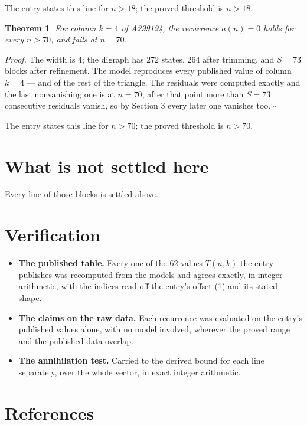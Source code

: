\documentclass[11pt]{article}
\newtheorem{theorem}{Theorem}
\theoremstyle{definition}
\begin{document}
The entry states this line for $n > 18$; the proved threshold is $n > 18$.

\begin{theorem} For column $k = 4$ of A299194, the recurrence $a(n) = 0$ holds for every $n > 70$, and fails at $n = 70$.\end{theorem}

{\itshape Proof.} The width is $4$; the digraph has $272$ states, $264$ after trimming, and $S = 73$ blocks after refinement. The model reproduces every published value of column $k = 4$ --- and of the rest of the triangle. The residuals were computed exactly and the last nonvanishing one is at $n = 70$; after that point more than $S = 73$ consecutive residuals vanish, so by Section 3 every later one vanishes too. $\square$

The entry states this line for $n > 70$; the proved threshold is $n > 70$.

\section{What is not settled here}

Every line of those blocks is settled above.

\section{Verification}

\begin{itemize}

\item {\bfseries The published table.} Every one of the 62 values $T(n,k)$ the entry publishes was recomputed from the models and agrees exactly, in integer arithmetic, with the indices read off the entry's offset (1) and its stated shape.

\item {\bfseries The claims on the raw data.} Each recurrence was evaluated on the entry's published values alone, with no model involved, wherever the proved range and the published data overlap.

\item {\bfseries The annihilation test.} Carried to the derived bound for each line separately, over the whole vector, in exact integer arithmetic.

\end{itemize}

\section{References}
\end{document}
